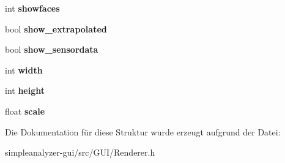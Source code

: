 \begin{DoxyCompactItemize}
\item 
\hypertarget{structViewport__info_add7c3d130d8315c0c0fcc14eed64183d}{int {\bfseries showfaces}}\label{structViewport__info_add7c3d130d8315c0c0fcc14eed64183d}

\item 
\hypertarget{structViewport__info_ae66c2a5bbd89cf47a280122bc15fad15}{bool {\bfseries show\-\_\-extrapolated}}\label{structViewport__info_ae66c2a5bbd89cf47a280122bc15fad15}

\item 
\hypertarget{structViewport__info_a8b44979d9834ef9c3e9086eaa6de1c6d}{bool {\bfseries show\-\_\-sensordata}}\label{structViewport__info_a8b44979d9834ef9c3e9086eaa6de1c6d}

\item 
\hypertarget{structViewport__info_ab8928b607a52ac0c1a5e95c8de7e8cf9}{int {\bfseries width}}\label{structViewport__info_ab8928b607a52ac0c1a5e95c8de7e8cf9}

\item 
\hypertarget{structViewport__info_a465b07df7f804b632968bc112b95aed9}{int {\bfseries height}}\label{structViewport__info_a465b07df7f804b632968bc112b95aed9}

\item 
\hypertarget{structViewport__info_a3e9e50b90a4f11a15ac02c8e53aecc88}{float {\bfseries scale}}\label{structViewport__info_a3e9e50b90a4f11a15ac02c8e53aecc88}

\end{DoxyCompactItemize}


Die Dokumentation für diese Struktur wurde erzeugt aufgrund der Datei\-:\begin{DoxyCompactItemize}
\item 
simpleanalyzer-\/gui/src/\-G\-U\-I/Renderer.\-h\end{DoxyCompactItemize}
